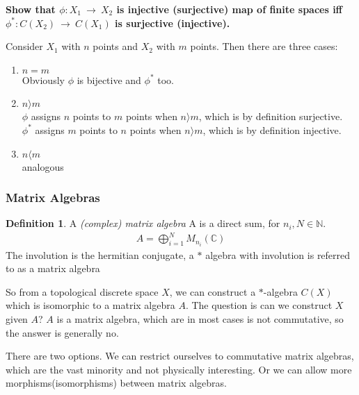 \documentclass[a4paper]{article}
\newcounter{exercise}
\newenvironment{MyExercise}%
{\begin{mdframed}[style=exercisestyle]}{\end{mdframed}}
\theoremstyle{definition}
\newtheorem{definition}{Definition}
\theoremstyle{definition}
\theoremstyle{definition}
\theoremstyle{theorem}
\theoremstyle{theorem}
\begin{document}
\begin{MyExercise}
    \textbf{
    Show that $\phi :X_1\ \rightarrow \ X_2$ is injective (surjective) map of finite spaces iff
    $\phi ^* :C(X_2)\ \rightarrow \ C(X_1)$ is surjective (injective).
}\newline

    Consider $X_1$ with $n$ points and $X_2$ with $m$ points. Then there are three cases:
    \begin{enumerate}
        \item $n=m$ \\
            Obviously $\phi$ is bijective and $\phi ^*$ too.
        \item $n \rangle  m$ \\
            $\phi$ assigns $n$ points to $m$ points when $n \rangle  m$,
            which is by definition surjective. \\
            $\phi ^*$ assigns $m$ points to $n$ points when $n \rangle  m$,
            which is by definition injective. \\
        \item $n \langle  m $ \\
            analogous
    \end{enumerate}
\end{MyExercise}

\subsubsection{Matrix Algebras}
\begin{definition}
    A \textit{(complex) matrix algebra} A is a direct sum, for $n_i, N \in \mathbb{N}$.
    \begin{align}
        A = \bigoplus _{i=1}^{N} M_{n_i}(\mathbb{C})
    \end{align}
    The involution is the hermitian conjugate, a $*$ algebra with involution is referred to as
    a matrix algebra
\end{definition}

So from a topological discrete space $X$, we can construct a $*$-algebra $C(X)$ which is isomorphic
to a matrix algebra $A$. The question is can we construct $X$ given $A$? $A$ is a matrix algebra,
which are in most cases is not commutative, so the answer is generally no.

There are two options. We can restrict ourselves to commutative matrix algebras,
which are the vast minority and not physically interesting.
Or we can allow more morphisms(isomorphisms) between matrix algebras.
\end{document}
